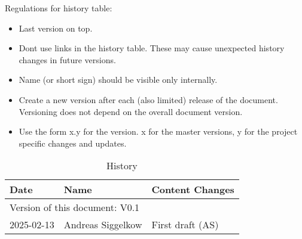Regulations for history table:
\begin{itemize}
  \item Last version on top.
  \item Dont use links in the history table. These may cause unexpected history changes in future versions.
  \item Name (or short sign) should be visible only internally.
  \item Create a new version after each (also limited) release of the document. Versioning does not depend on the overall document version.
  \item Use the form x.y for the version. x for the master versions, y for the project specific changes and updates.
\end{itemize}

\begin{table}[H]
\caption{History}
\label{tab:gpiohistory01}
\centering
\begin{tabularx}{\textwidth}{|X |X |X |}
  \hline
  Date & Name & Content Changes \\
  \hline
  \multicolumn{3}{|l|}{Version of this document: V0.1} \\
  \hline
  2025-02-13 & Andreas Siggelkow & First draft (AS) \\
  \hline
\end{tabularx}
\end{table}
